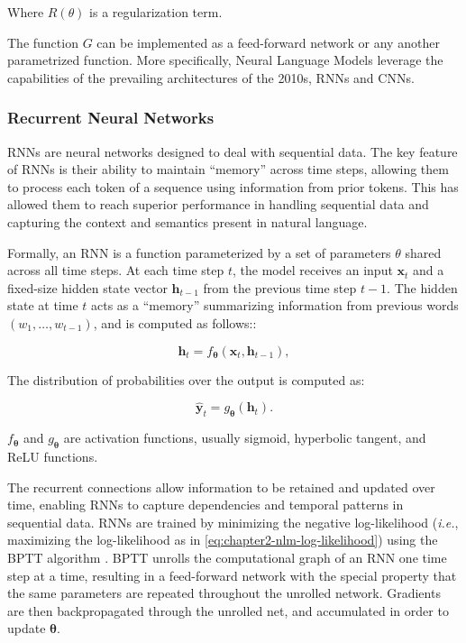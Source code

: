 \noindent Where $R(\theta)$ is a regularization term.

The function $G$ can be implemented as a feed-forward network or any another parametrized function. More specifically, Neural Language Models leverage the capabilities of the prevailing architectures of the 2010s, \acp{RNN} and \acp{CNN}.


\subsubsection{Recurrent Neural Networks}

\acp{RNN} are neural networks designed to deal with sequential data. The key feature of \acp{RNN} is their ability to maintain “memory” across time steps, allowing them to process each token of a sequence using information from prior tokens. This has allowed them to reach superior performance in handling sequential data and capturing the context and semantics present in natural language.  

\noindent Formally, an \ac{RNN} is a function parameterized by a set of parameters $\theta$ shared across all time steps. At each time step $t$, the model receives an input $\bm{x}_t$ and a fixed-size hidden state vector $\bm{h}_{t-1}$ from the previous time step $t-1$. The hidden state at time $t$ acts as a “memory” summarizing information from previous words $(w_1, \ldots, w_{t-1})$, and is computed as follows::

\begin{equation}
    \bm{h}_{t} = f_{\bm{\theta}}(\bm{x}_t, \bm{h}_{t-1}),  
\end{equation}

The distribution of probabilities over the output is computed as:

\begin{equation}
    \hat{\bm{y}}_t = g_{\bm{\theta}}(\bm{h}_t).
\end{equation}

\noindent $f_{\bm{\theta}}$ and $g_{\bm{\theta}}$ are activation functions, usually sigmoid, hyperbolic tangent, and \ac{ReLU} functions.

The recurrent connections allow information to be retained and updated over time, enabling \acp{RNN} to capture dependencies and temporal patterns in sequential data. \acp{RNN} are trained by minimizing the negative log-likelihood (\textit{i.e.}, maximizing the log-likelihood as in \ref{eq:chapter2-nlm-log-likelihood}) using the \ac{BPTT} algorithm \citep{werbos1990backpropagation}. \ac{BPTT} unrolls the computational graph of an \ac{RNN} one time step at a time, resulting in a feed-forward network with the special property that the same parameters are repeated throughout the unrolled network. Gradients are then backpropagated through the unrolled net, and accumulated in order to update $\bm{\theta}$. 

